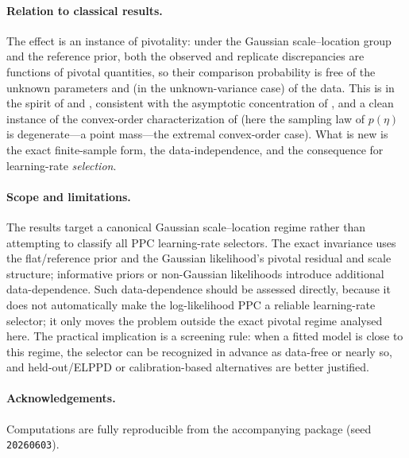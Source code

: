 \documentclass[11pt]{article}
\theoremstyle{remark}
\begin{document}
\paragraph{Relation to classical results.} The effect is an instance of pivotality: under the Gaussian
scale--location group and the reference prior, both the observed and replicate discrepancies are functions of
pivotal quantities, so their comparison probability is free of the unknown parameters and (in the unknown-variance
case) of the data. This is in the spirit of \citet{meng1994} and \citet{gelman1996}, consistent with the
asymptotic concentration of \citet{robins2000}, and a clean instance of the convex-order characterization of
\citet{rdl2015} (here the sampling law of $p(\eta)$ is degenerate---a point mass---the extremal convex-order
case). What is new is the exact finite-sample form, the data-independence, and the consequence for
learning-rate \emph{selection}.

\paragraph{Scope and limitations.} The results target a canonical Gaussian scale--location regime rather than
attempting to classify all PPC learning-rate selectors. The exact invariance uses the flat/reference prior and the
Gaussian likelihood's pivotal residual and scale structure; informative priors or non-Gaussian likelihoods introduce
additional data-dependence. Such data-dependence should be assessed directly, because it does not automatically make
the log-likelihood PPC a reliable learning-rate selector; it only moves the problem outside the exact pivotal regime
analysed here. The practical implication is a screening rule: when a fitted model is close to this regime, the
selector can be recognized in advance as data-free or nearly so, and held-out/ELPPD or calibration-based alternatives
are better justified.

\paragraph{Acknowledgements.} Computations are fully reproducible from the accompanying package (seed
\texttt{20260603}).
\end{document}
